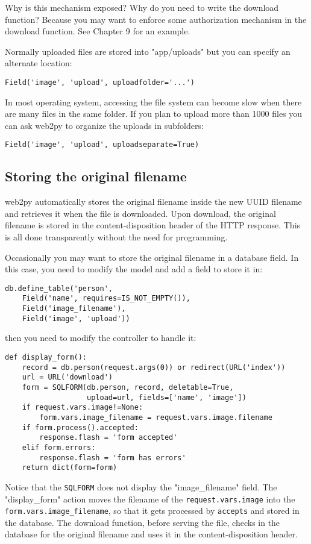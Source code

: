 \documentclass[justified,sixbynine,notoc]{tufte-book}
\def\ft{\small\tt}
\begin{document}
\begin{fullwidth}
Why is this mechanism exposed? Why do you need to write the download function? Because you may want to enforce some authorization mechanism in the download function. See Chapter 9 for an example.

Normally uploaded files are stored into "app/uploads" but you can specify an alternate location:
\begin{lstlisting}
Field('image', 'upload', uploadfolder='...')
\end{lstlisting}
In most operating system, accessing the file system can become slow when there are many files in the same folder. If you plan to upload more than 1000 files you can ask web2py to organize the uploads in subfolders:
\begin{lstlisting}
Field('image', 'upload', uploadseparate=True)
\end{lstlisting}

\goodbreak\subsection{Storing the original filename}
\noindent web2py automatically stores the original filename inside the new UUID filename and retrieves it when the file is downloaded. Upon download, the original filename is stored in the content-disposition header of the HTTP response. This is all done transparently without the need for programming.

Occasionally you may want to store the original filename in a database field. In this case, you need to modify the model and add a field to store it in:
\begin{lstlisting}
db.define_table('person',
    Field('name', requires=IS_NOT_EMPTY()),
    Field('image_filename'),
    Field('image', 'upload'))
\end{lstlisting}
\noindent then you need to modify the controller to handle it:
\begin{lstlisting}
def display_form():
    record = db.person(request.args(0)) or redirect(URL('index'))
    url = URL('download')
    form = SQLFORM(db.person, record, deletable=True,
                   upload=url, fields=['name', 'image'])
    if request.vars.image!=None:
        form.vars.image_filename = request.vars.image.filename
    if form.process().accepted:
        response.flash = 'form accepted'
    elif form.errors:
        response.flash = 'form has errors'
    return dict(form=form)
\end{lstlisting}

Notice that the {\ft SQLFORM} does not display the "image\_filename" field.
The "display\_form" action moves the filename of the {\ft request.vars.image}
into the {\ft form.vars.image\_filename}, so that it gets processed by {\ft accepts} and
stored in the database. The download function, before serving the file, checks in the database for the original filename and uses it in the content-disposition header.


\end{fullwidth}
\end{document}
